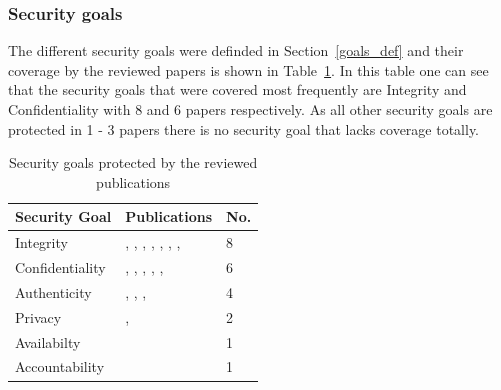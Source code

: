 \documentclass[runningheads]{llncs}
\begin{document}
\subsubsection{Security goals}\label{goals}
The different security goals were definded in Section~\ref{goals_def} and their coverage by the reviewed papers is shown in Table~\ref{goals_table}. In this table one can see that the security goals
that were covered most frequently are Integrity and Confidentiality with 8 and 6 papers respectively. As all other security goals are protected in 1 - 3 papers there is no security
goal that lacks coverage totally.
\begin{table}
    \centering
    \caption{Security goals protected by the reviewed publications}
    \begin{tabular}{ | l | l | l | }
        \hline
        \textbf{Security Goal} & \textbf{Publications}                                                                                                                                                            & \textbf{No. } \\
        \hline
        \hline
        Integrity              & \cite{Leitner2013719}, \cite{Mardani2013}, \cite{Accorsi20131462}, \cite{Mishra2018613}, \cite{MozafariMehr2022397}, \cite{Breitmayer202411}, \cite{Sarno2020}, \cite{MacAk2020} & 8             \\
        \hline
        Confidentiality        & \cite{Leitner2013719}, \cite{Accorsi20131462}, \cite{Mishra2018613}, \cite{MozafariMehr2022397}, \cite{Breitmayer202411}, \cite{MacAk2020}                                       & 6             \\
        \hline
        Authenticity           & \cite{Mardani2013}, \cite{Accorsi20131462}, \cite{Mishra2018613}, \cite{MozafariMehr2022397}                                                                                     & 4             \\
        \hline
        Privacy                & \cite{Zaman20192982}, \cite{MozafariMehr202182}                                                                                                                                  & 2             \\
        \hline
        Availabilty            & \cite{Mishra2018613}                                                                                                                                                             & 1             \\
        \hline
        Accountability         & \cite{Mardani2013}                                                                                                                                                               & 1             \\
        \hline
    \end{tabular}
    \label{goals_table}
\end{table}
\end{document}
